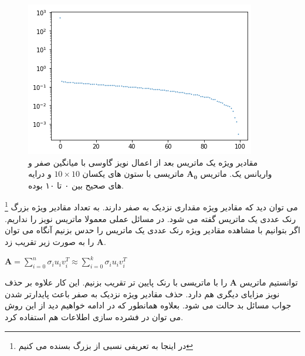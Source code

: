 	\begin{figure}[h]
		\centering
		\includegraphics[width=0.7\linewidth]{assets/zero_eigenvals}
		\caption{
			مقادیر ویژه یک ماتریس بعد از اعمال نویز گاوسی با میانگین صفر و واریانس یک. ماتریس $ \mathbf{A_0} $ ماتریسی با ستون های یکسان $ 10 \times 10 $ و درایه های صحیح بین ۰ تا ۱۰ بوده. 
		}
	\end{figure}
	می توان دید که مقادیر ویژه مقداری نزدیک به صفر دارند. به تعداد مقادیر ویژه بزرگ \footnote{در اینجا به تعریفی نسبی از بزرگ بسنده می کنیم} رنک عددی یک ماتریس گفته می شود. در مسائل عملی معمولا ماتریس نویز را نداریم. اگر بتوانیم با مشاهده مقادیر ویژه رنک عددی یک ماتریس را حدس بزنیم آنگاه می توان $ \mathbf{A} $ را به صورت زیر تقریب زد. 
	\begin{center}
		$ \mathbf{A} = \sum_{i=0}^{n} \sigma_iu_iv_i^T \approx \sum_{i=0}^{k} \sigma_iu_iv_i^T $
	\end{center}
	توانستیم ماتریس  $ \mathbf{A} $ را با ماتریسی با رنک پایین تر تقریب بزنیم. این کار علاوه بر حذف نویز مزایای دیگری هم دارد. حذف مقادیر ویژه نزدیک به صفر باعث پایدارتر شدن جواب مسائل بد حالت  می شود. بعلاوه همانطور که در ادامه خواهیم دید از این روش می توان در فشرده سازی اطلاعات هم استفاده کرد. 
	\label{sec:mat_approx}

	